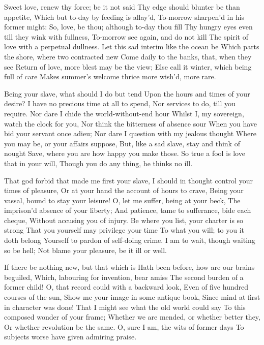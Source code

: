 \documentclass[twocolumn]{book}
\begin{document}
Sweet love, renew thy force; be it not said
Thy edge should blunter be than appetite,
Which but to-day by feeding is allay'd,
To-morrow sharpen'd in his former might:
So, love, be thou; although to-day thou fill
Thy hungry eyes even till they wink with fullness,
To-morrow see again, and do not kill
The spirit of love with a perpetual dullness.
Let this sad interim like the ocean be
Which parts the shore, where two contracted new
Come daily to the banks, that, when they see
Return of love, more blest may be the view;
  Else call it winter, which being full of care
  Makes summer's welcome thrice more wish'd, more rare.


Being your slave, what should I do but tend
Upon the hours and times of your desire?
I have no precious time at all to spend,
Nor services to do, till you require.
Nor dare I chide the world-without-end hour
Whilst I, my sovereign, watch the clock for you,
Nor think the bitterness of absence sour
When you have bid your servant once adieu;
Nor dare I question with my jealous thought
Where you may be, or your affairs suppose,
But, like a sad slave, stay and think of nought
Save, where you are how happy you make those.
  So true a fool is love that in your will,
  Though you do any thing, he thinks no ill.

That god forbid that made me first your slave,
I should in thought control your times of pleasure,
Or at your hand the account of hours to crave,
Being your vassal, bound to stay your leisure!
O, let me suffer, being at your beck,
The imprison'd absence of your liberty;
And patience, tame to sufferance, bide each cheque,
Without accusing you of injury.
Be where you list, your charter is so strong
That you yourself may privilege your time
To what you will; to you it doth belong
Yourself to pardon of self-doing crime.
  I am to wait, though waiting so be hell;
  Not blame your pleasure, be it ill or well.

If there be nothing new, but that which is
Hath been before, how are our brains beguiled,
Which, labouring for invention, bear amiss
The second burden of a former child!
\numerus*{}O, that record could with a backward look,
Even of five hundred courses of the sun,
Show me your image in some antique book,
Since mind at first in character was done!
That I might see what the old world could say
To this composed wonder of your frame;
Whether we are mended, or whether better they,
Or whether revolution be the same.
  O, sure I am, the wits of former days
  To subjects worse have given admiring praise.
\end{document}
